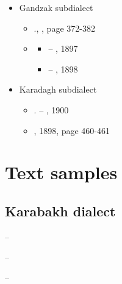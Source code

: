 \begin{itemize}
\begin{itemize}
\begin{itemize}
\begin{itemize}
				\begin{adjarianpage}\label{page:72}\end{adjarianpage}%
				\item – 
				\item – 
			\end{itemize}
			
		\end{itemize}
		
		\item Gandzak subdialect
		\begin{itemize}
			\item {}., , page 372-382
			\item {} 
			\begin{itemize}
				\item – , 1897
				\item – , 1898
			\end{itemize}
		\end{itemize}
		
		\item Karadagh subdialect
		\begin{itemize}
			\item {}. – , 1900
			\item {}, 1898, page 460-461
			
		\end{itemize}
		
	\end{itemize}
\end{itemize}

\section{Text samples}

{\sampleoverview}

\subsection{Karabakh dialect} 


– 

– 

– 

